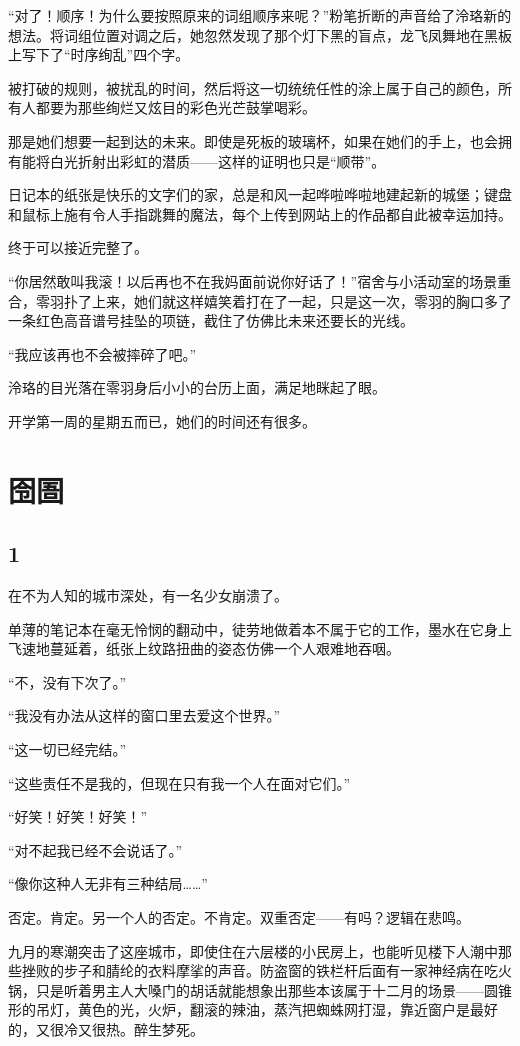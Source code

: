 \documentclass[UTF8, scheme = chinese, openany]{ctexbook}
\begin{document}
“对了！顺序！为什么要按照原来的词组顺序来呢？”粉笔折断的声音给了泠珞新的想法。将词组位置对调之后，她忽然发现了那个灯下黑的盲点，龙飞凤舞地在黑板上写下了“时序绚乱”四个字。

被打破的规则，被扰乱的时间，然后将这一切统统任性的涂上属于自己的颜色，所有人都要为那些绚烂又炫目的彩色光芒鼓掌喝彩。

那是她们想要一起到达的未来。即使是死板的玻璃杯，如果在她们的手上，也会拥有能将白光折射出彩虹的潜质——这样的证明也只是“顺带”。

日记本的纸张是快乐的文字们的家，总是和风一起哗啦哗啦地建起新的城堡；键盘和鼠标上施有令人手指跳舞的魔法，每个上传到网站上的作品都自此被幸运加持。

终于可以接近完整了。

“你居然敢叫我滚！以后再也不在我妈面前说你好话了！”宿舍与小活动室的场景重合，零羽扑了上来，她们就这样嬉笑着打在了一起，只是这一次，零羽的胸口多了一条红色高音谱号挂坠的项链，截住了仿佛比未来还要长的光线。

“我应该再也不会被摔碎了吧。”

泠珞的目光落在零羽身后小小的台历上面，满足地眯起了眼。

开学第一周的星期五而已，她们的时间还有很多。

\section{囹圄}

\subsection{1}

在不为人知的城市深处，有一名少女崩溃了。

单薄的笔记本在毫无怜悯的翻动中，徒劳地做着本不属于它的工作，墨水在它身上飞速地蔓延着，纸张上纹路扭曲的姿态仿佛一个人艰难地吞咽。

“不，没有下次了。”

“我没有办法从这样的窗口里去爱这个世界。”

“这一切已经完结。”

“这些责任不是我的，但现在只有我一个人在面对它们。”

“好笑！好笑！好笑！”

“对不起我已经不会说话了。”

“像你这种人无非有三种结局……”

否定。肯定。另一个人的否定。不肯定。双重否定——有吗？逻辑在悲鸣。

九月的寒潮突击了这座城市，即使住在六层楼的小民房上，也能听见楼下人潮中那些挫败的步子和腈纶的衣料摩挲的声音。防盗窗的铁栏杆后面有一家神经病在吃火锅，只是听着男主人大嗓门的胡话就能想象出那些本该属于十二月的场景——圆锥形的吊灯，黄色的光，火炉，翻滚的辣油，蒸汽把蜘蛛网打湿，靠近窗户是最好的，又很冷又很热。醉生梦死。
\end{document}
